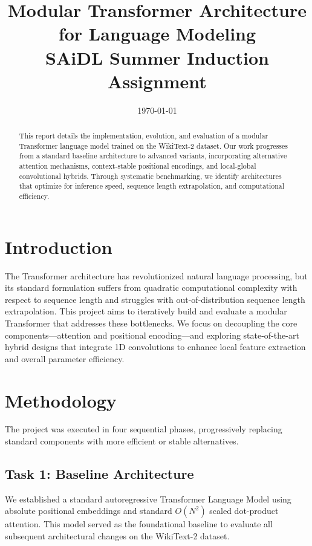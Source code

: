 \documentclass[11pt,a4paper]{article}
\title{\textbf{Modular Transformer Architecture for Language Modeling} \\ \large SAiDL Summer Induction Assignment}
\author{}
\date{\today}
\begin{document}
\maketitle

\begin{abstract}
This report details the implementation, evolution, and evaluation of a modular Transformer language model trained on the WikiText-2 dataset. Our work progresses from a standard baseline architecture to advanced variants, incorporating alternative attention mechanisms, context-stable positional encodings, and local-global convolutional hybrids. Through systematic benchmarking, we identify architectures that optimize for inference speed, sequence length extrapolation, and computational efficiency.
\end{abstract}

\section{Introduction}
The Transformer architecture has revolutionized natural language processing, but its standard formulation suffers from quadratic computational complexity with respect to sequence length and struggles with out-of-distribution sequence length extrapolation. This project aims to iteratively build and evaluate a modular Transformer that addresses these bottlenecks. We focus on decoupling the core components---attention and positional encoding---and exploring state-of-the-art hybrid designs that integrate 1D convolutions to enhance local feature extraction and overall parameter efficiency.

\section{Methodology}

The project was executed in four sequential phases, progressively replacing standard components with more efficient or stable alternatives.

\subsection{Task 1: Baseline Architecture}
We established a standard autoregressive Transformer Language Model using absolute positional embeddings and standard $O(N^2)$ scaled dot-product attention. This model served as the foundational baseline to evaluate all subsequent architectural changes on the WikiText-2 dataset.
\end{document}
